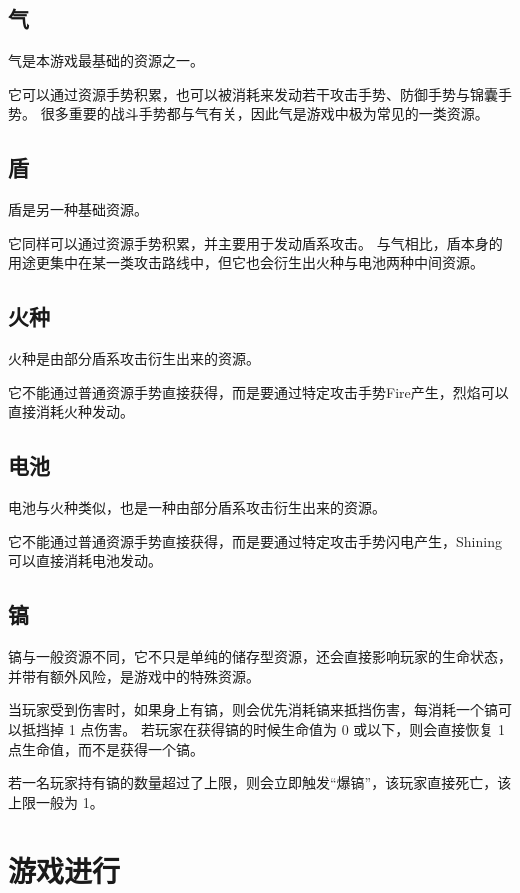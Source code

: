 \documentclass[12pt]{ctexart}
\begin{document}
\subsection{气}

气是本游戏最基础的资源之一。

它可以通过资源手势积累，也可以被消耗来发动若干攻击手势、防御手势与锦囊手势。
很多重要的战斗手势都与气有关，因此气是游戏中极为常见的一类资源。

\subsection{盾}

盾是另一种基础资源。

它同样可以通过资源手势积累，并主要用于发动盾系攻击。
与气相比，盾本身的用途更集中在某一类攻击路线中，但它也会衍生出火种与电池两种中间资源。

\subsection{火种}

火种是由部分盾系攻击衍生出来的资源。

它不能通过普通资源手势直接获得，而是要通过特定攻击手势Fire产生，烈焰可以直接消耗火种发动。

\subsection{电池}

电池与火种类似，也是一种由部分盾系攻击衍生出来的资源。

它不能通过普通资源手势直接获得，而是要通过特定攻击手势闪电产生，Shining可以直接消耗电池发动。

\subsection{镐}

镐与一般资源不同，它不只是单纯的储存型资源，还会直接影响玩家的生命状态，并带有额外风险，是游戏中的特殊资源。

当玩家受到伤害时，如果身上有镐，则会优先消耗镐来抵挡伤害，每消耗一个镐可以抵挡掉 1 点伤害。
若玩家在获得镐的时候生命值为 0 或以下，则会直接恢复 1 点生命值，而不是获得一个镐。

若一名玩家持有镐的数量超过了上限，则会立即触发“爆镐”，该玩家直接死亡，该上限一般为 1。

\section{游戏进行}
\end{document}
